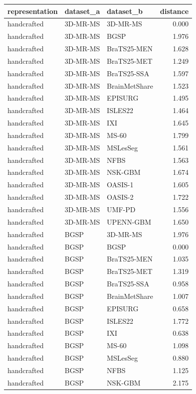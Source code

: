\begin{tabular}{lllr}
\toprule
representation & dataset\_a & dataset\_b & distance \\
\midrule
handcrafted & 3D-MR-MS & 3D-MR-MS & 0.000 \\
handcrafted & 3D-MR-MS & BGSP & 1.976 \\
handcrafted & 3D-MR-MS & BraTS25-MEN & 1.628 \\
handcrafted & 3D-MR-MS & BraTS25-MET & 1.249 \\
handcrafted & 3D-MR-MS & BraTS25-SSA & 1.597 \\
handcrafted & 3D-MR-MS & BrainMetShare & 1.523 \\
handcrafted & 3D-MR-MS & EPISURG & 1.495 \\
handcrafted & 3D-MR-MS & ISLES22 & 1.464 \\
handcrafted & 3D-MR-MS & IXI & 1.645 \\
handcrafted & 3D-MR-MS & MS-60 & 1.799 \\
handcrafted & 3D-MR-MS & MSLesSeg & 1.561 \\
handcrafted & 3D-MR-MS & NFBS & 1.563 \\
handcrafted & 3D-MR-MS & NSK-GBM & 1.674 \\
handcrafted & 3D-MR-MS & OASIS-1 & 1.605 \\
handcrafted & 3D-MR-MS & OASIS-2 & 1.722 \\
handcrafted & 3D-MR-MS & UMF-PD & 1.556 \\
handcrafted & 3D-MR-MS & UPENN-GBM & 1.650 \\
handcrafted & BGSP & 3D-MR-MS & 1.976 \\
handcrafted & BGSP & BGSP & 0.000 \\
handcrafted & BGSP & BraTS25-MEN & 1.035 \\
handcrafted & BGSP & BraTS25-MET & 1.319 \\
handcrafted & BGSP & BraTS25-SSA & 0.958 \\
handcrafted & BGSP & BrainMetShare & 1.007 \\
handcrafted & BGSP & EPISURG & 0.658 \\
handcrafted & BGSP & ISLES22 & 1.772 \\
handcrafted & BGSP & IXI & 0.638 \\
handcrafted & BGSP & MS-60 & 1.098 \\
handcrafted & BGSP & MSLesSeg & 0.880 \\
handcrafted & BGSP & NFBS & 1.125 \\
handcrafted & BGSP & NSK-GBM & 2.175 \\

\end{tabular}
